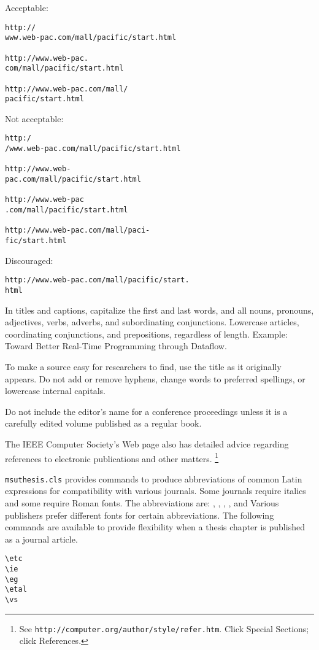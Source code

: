 \noindent Acceptable:
\begin{verbatim}
http://
www.web-pac.com/mall/pacific/start.html 

http://www.web-pac.
com/mall/pacific/start.html

http://www.web-pac.com/mall/
pacific/start.html
\end{verbatim}
Not acceptable:
\begin{verbatim}
http:/
/www.web-pac.com/mall/pacific/start.html

http://www.web-
pac.com/mall/pacific/start.html

http://www.web-pac
.com/mall/pacific/start.html

http://www.web-pac.com/mall/paci-
fic/start.html
\end{verbatim}
Discouraged:
\begin{verbatim}
http://www.web-pac.com/mall/pacific/start.
html
\end{verbatim}


In titles and captions,
capitalize the first and last words, and all nouns, pronouns,
adjectives, verbs, adverbs, and subordinating conjunctions.
Lowercase articles, coordinating conjunctions, and
prepositions, regardless of length. Example: Toward Better
Real-Time Programming through Dataflow. 

To make a source easy for researchers to find, use the title as
it originally appears. Do not add or remove hyphens, change
words to preferred spellings, or lowercase internal capitals. 

Do not include the editor's name for a conference
proceedings unless it is a carefully edited volume published
as a regular book.

The IEEE Computer Society's Web page also has detailed advice
regarding references to electronic publications and other matters.%
\footnote{%
See {\footnotesize\tt http://computer.org/author/style/refer.htm}. Click Special Sections; click References.  
}

%
%
{\tt msuthesis.cls} provides commands to produce abbreviations of 
common Latin expressions for compatibility with various journals.
Some journals require italics and some require Roman fonts.  
The abbreviations are: \etc, \eg, \ie, \etal, and \vs
Various publishers prefer different fonts for certain
abbreviations.  The following commands are available
to provide flexibility
when a thesis chapter is published as a journal article.

\newspacing{\singlespacing}\begin{verbatim}
\etc
\ie
\eg
\etal
\vs
\end{verbatim}

